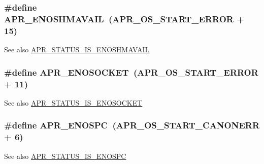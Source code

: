 \subsubsection[{\texorpdfstring{A\+P\+R\+\_\+\+E\+N\+O\+S\+H\+M\+A\+V\+A\+IL}{APR_ENOSHMAVAIL}}]{\setlength{\rightskip}{0pt plus 5cm}\#define A\+P\+R\+\_\+\+E\+N\+O\+S\+H\+M\+A\+V\+A\+IL~({\bf A\+P\+R\+\_\+\+O\+S\+\_\+\+S\+T\+A\+R\+T\+\_\+\+E\+R\+R\+OR} + 15)}\hypertarget{group__APR__Error_ga67516f4e87197490333480a8bbc78725}{}\label{group__APR__Error_ga67516f4e87197490333480a8bbc78725}
\begin{DoxySeeAlso}{See also}
\hyperlink{group__APR__STATUS__IS_ga99af86378a3ac8eb5a59f1acffec6440}{A\+P\+R\+\_\+\+S\+T\+A\+T\+U\+S\+\_\+\+I\+S\+\_\+\+E\+N\+O\+S\+H\+M\+A\+V\+A\+IL} 
\end{DoxySeeAlso}
\subsubsection[{\texorpdfstring{A\+P\+R\+\_\+\+E\+N\+O\+S\+O\+C\+K\+ET}{APR_ENOSOCKET}}]{\setlength{\rightskip}{0pt plus 5cm}\#define A\+P\+R\+\_\+\+E\+N\+O\+S\+O\+C\+K\+ET~({\bf A\+P\+R\+\_\+\+O\+S\+\_\+\+S\+T\+A\+R\+T\+\_\+\+E\+R\+R\+OR} + 11)}\hypertarget{group__APR__Error_ga99e125e203a1d44f12bd88b41696716d}{}\label{group__APR__Error_ga99e125e203a1d44f12bd88b41696716d}
\begin{DoxySeeAlso}{See also}
\hyperlink{group__APR__STATUS__IS_gae415d3119f7b13edc8af627a5e3f440b}{A\+P\+R\+\_\+\+S\+T\+A\+T\+U\+S\+\_\+\+I\+S\+\_\+\+E\+N\+O\+S\+O\+C\+K\+ET} 
\end{DoxySeeAlso}
\subsubsection[{\texorpdfstring{A\+P\+R\+\_\+\+E\+N\+O\+S\+PC}{APR_ENOSPC}}]{\setlength{\rightskip}{0pt plus 5cm}\#define A\+P\+R\+\_\+\+E\+N\+O\+S\+PC~({\bf A\+P\+R\+\_\+\+O\+S\+\_\+\+S\+T\+A\+R\+T\+\_\+\+C\+A\+N\+O\+N\+E\+RR} + 6)}\hypertarget{group__APR__Error_ga1dfc0bbf080f17b0b9010ef967542193}{}\label{group__APR__Error_ga1dfc0bbf080f17b0b9010ef967542193}
\begin{DoxySeeAlso}{See also}
\hyperlink{group__APR__STATUS__IS_ga5c77e7bb1de1b6ec319f2a42eb80be1e}{A\+P\+R\+\_\+\+S\+T\+A\+T\+U\+S\+\_\+\+I\+S\+\_\+\+E\+N\+O\+S\+PC} 
\end{DoxySeeAlso}
